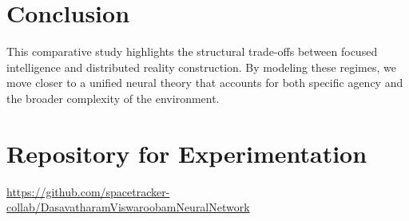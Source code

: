 \documentclass[12pt]{article}
\begin{document}
\section{Conclusion}
This comparative study highlights the structural trade-offs between focused intelligence and distributed reality construction. By modeling these regimes, we move closer to a unified neural theory that accounts for both specific agency and the broader complexity of the environment.

\section{Repository for Experimentation}
\noindent
\url{https://github.com/spacetracker-collab/DasavatharamViswaroobamNeuralNetwork}
\end{document}
